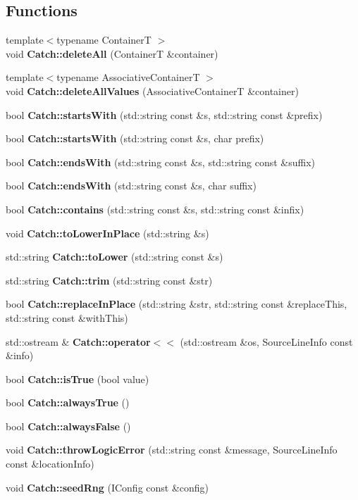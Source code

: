 \subsection*{Functions}
\begin{DoxyCompactItemize}
\item 
{\footnotesize template$<$typename ContainerT $>$ }\\void \textbf{ Catch\+::delete\+All} (ContainerT \&container)
\item 
{\footnotesize template$<$typename Associative\+ContainerT $>$ }\\void \textbf{ Catch\+::delete\+All\+Values} (Associative\+ContainerT \&container)
\item 
bool \textbf{ Catch\+::starts\+With} (std\+::string const \&s, std\+::string const \&prefix)
\item 
bool \textbf{ Catch\+::starts\+With} (std\+::string const \&s, char prefix)
\item 
bool \textbf{ Catch\+::ends\+With} (std\+::string const \&s, std\+::string const \&suffix)
\item 
bool \textbf{ Catch\+::ends\+With} (std\+::string const \&s, char suffix)
\item 
bool \textbf{ Catch\+::contains} (std\+::string const \&s, std\+::string const \&infix)
\item 
void \textbf{ Catch\+::to\+Lower\+In\+Place} (std\+::string \&s)
\item 
std\+::string \textbf{ Catch\+::to\+Lower} (std\+::string const \&s)
\item 
std\+::string \textbf{ Catch\+::trim} (std\+::string const \&str)
\item 
bool \textbf{ Catch\+::replace\+In\+Place} (std\+::string \&str, std\+::string const \&replace\+This, std\+::string const \&with\+This)
\item 
std\+::ostream \& \textbf{ Catch\+::operator$<$$<$} (std\+::ostream \&os, Source\+Line\+Info const \&info)
\item 
bool \textbf{ Catch\+::is\+True} (bool value)
\item 
bool \textbf{ Catch\+::always\+True} ()
\item 
bool \textbf{ Catch\+::always\+False} ()
\item 
void \textbf{ Catch\+::throw\+Logic\+Error} (std\+::string const \&message, Source\+Line\+Info const \&location\+Info)
\item 
void \textbf{ Catch\+::seed\+Rng} (I\+Config const \&config)
\item 

\end{DoxyCompactItemize}
